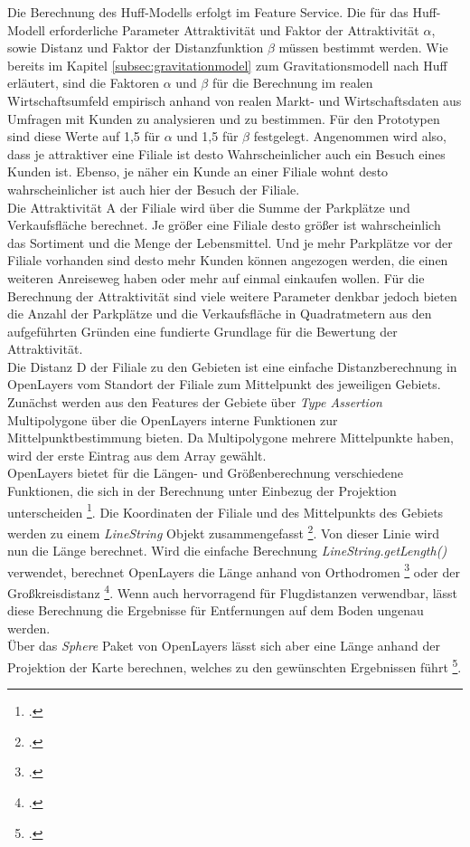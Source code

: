 Die Berechnung des Huff-Modells erfolgt im Feature Service.
Die für das Huff-Modell erforderliche Parameter Attraktivität und Faktor der Attraktivität $\alpha$, sowie Distanz und Faktor der Distanzfunktion $\beta$ müssen bestimmt werden.
Wie bereits im Kapitel \ref{subsec:gravitationmodel} zum Gravitationsmodell nach Huff erläutert, sind die Faktoren $\alpha$ und $\beta$ für die Berechnung im realen Wirtschaftsumfeld empirisch anhand von realen Markt- und Wirtschaftsdaten aus Umfragen mit Kunden zu analysieren und zu bestimmen.
Für den Prototypen sind diese Werte auf 1,5 für $\alpha$ und 1,5 für $\beta$ festgelegt.
Angenommen wird also, dass je attraktiver eine Filiale ist desto Wahrscheinlicher auch ein Besuch eines Kunden ist.
Ebenso, je näher ein Kunde an einer Filiale wohnt desto wahrscheinlicher ist auch hier der Besuch der Filiale.\\
Die Attraktivität A der Filiale wird über die Summe der Parkplätze und Verkaufsfläche berechnet.
Je größer eine Filiale desto größer ist wahrscheinlich das Sortiment und die Menge der Lebensmittel.
Und je mehr Parkplätze vor der Filiale vorhanden sind desto mehr Kunden können angezogen werden, die einen weiteren Anreiseweg haben oder mehr auf einmal einkaufen wollen.
Für die Berechnung der Attraktivität sind viele weitere Parameter denkbar jedoch bieten die Anzahl der Parkplätze und die Verkaufsfläche in Quadratmetern aus den aufgeführten Gründen eine fundierte Grundlage für die Bewertung der Attraktivität.\\
Die Distanz D der Filiale zu den Gebieten ist eine einfache Distanzberechnung in OpenLayers vom Standort der Filiale zum Mittelpunkt des jeweiligen Gebiets.
Zunächst werden aus den Features der Gebiete über \emph{Type Assertion} Multipolygone über die OpenLayers interne Funktionen zur Mittelpunktbestimmung bieten.
Da Multipolygone mehrere Mittelpunkte haben, wird der erste Eintrag aus dem Array gewählt.\\
OpenLayers bietet für die Längen- und Größenberechnung verschiedene Funktionen, die sich in der Berechnung unter Einbezug der Projektion unterscheiden \footcite{openlayers_measure_example}.
Die Koordinaten der Filiale und des Mittelpunkts des Gebiets werden zu einem \emph{LineString} Objekt zusammengefasst \footcite{openlayers_linestring}.
Von dieser Linie wird nun die Länge berechnet.
Wird die einfache Berechnung \emph{LineString.getLength()} verwendet, berechnet OpenLayers die Länge anhand von Orthodromen \footcite{orthodrome_frassek} oder der Großkreisdistanz \footcite{great_circle_distance}.
Wenn auch hervorragend für Flugdistanzen verwendbar, lässt diese Berechnung die Ergebnisse für Entfernungen auf dem Boden ungenau werden.\\
Über das \emph{Sphere} Paket von OpenLayers lässt sich aber eine Länge anhand der Projektion der Karte berechnen, welches zu den gewünschten Ergebnissen führt \footcite{openlayers_sphere}.

